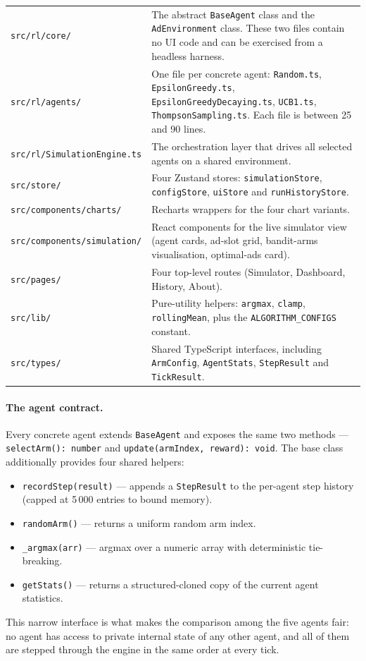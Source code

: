 \renewcommand{\arraystretch}{1.3}
\begin{tabularx}{\linewidth}{p{4.5cm} X}
\texttt{src/rl/core/}       & The abstract \texttt{BaseAgent} class and the \texttt{AdEnvironment} class. These two files contain no UI code and can be exercised from a headless harness.\\
\texttt{src/rl/agents/}     & One file per concrete agent: \texttt{Random.ts}, \texttt{EpsilonGreedy.ts}, \texttt{EpsilonGreedyDecaying.ts}, \texttt{UCB1.ts}, \texttt{ThompsonSampling.ts}. Each file is between 25 and 90 lines.\\
\texttt{src/rl/SimulationEngine.ts} & The orchestration layer that drives all selected agents on a shared environment.\\
\texttt{src/store/}         & Four Zustand stores: \texttt{simulationStore}, \texttt{configStore}, \texttt{uiStore} and \texttt{runHistoryStore}.\\
\texttt{src/components/charts/} & Recharts wrappers for the four chart variants.\\
\texttt{src/components/simulation/} & React components for the live simulator view (agent cards, ad-slot grid, bandit-arms visualisation, optimal-ads card).\\
\texttt{src/pages/}         & Four top-level routes (Simulator, Dashboard, History, About).\\
\texttt{src/lib/}           & Pure-utility helpers: \texttt{argmax}, \texttt{clamp}, \texttt{rollingMean}, plus the \texttt{ALGORITHM\_CONFIGS} constant.\\
\texttt{src/types/}         & Shared TypeScript interfaces, including \texttt{ArmConfig}, \texttt{AgentStats}, \texttt{StepResult} and \texttt{TickResult}.\\
\end{tabularx}

\paragraph{The agent contract.}
Every concrete agent extends \texttt{BaseAgent} and exposes the same two methods --- \texttt{selectArm(): number} and \texttt{update(armIndex, reward): void}. The base class additionally provides four shared helpers:
\begin{itemize}\itemsep0pt
  \item \texttt{recordStep(result)} --- appends a \texttt{StepResult} to the per-agent step history (capped at 5\,000 entries to bound memory).
  \item \texttt{randomArm()} --- returns a uniform random arm index.
  \item \texttt{\_argmax(arr)} --- argmax over a numeric array with deterministic tie-breaking.
  \item \texttt{getStats()} --- returns a structured-cloned copy of the current agent statistics.
\end{itemize}
This narrow interface is what makes the comparison among the five agents fair: no agent has access to private internal state of any other agent, and all of them are stepped through the engine in the same order at every tick.

